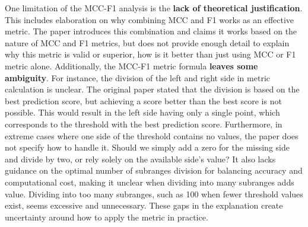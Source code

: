 \documentclass[12pt, oneside]{amsart}
\theoremstyle{definition}
\theoremstyle{remark}
\numberwithin{equation}{section}
\begin{document}
One limitation of the MCC-F1 analysis is the \textbf{lack of theoretical justification}. This includes elaboration on why combining MCC and F1 works as an effective metric. The paper introduces this combination and claims it works based on the nature of MCC and F1 metrics, but does not provide enough detail to explain why this metric is valid or superior, how is it better than just using MCC or F1 metric alone. Additionally, the MCC-F1 metric formula \textbf{leaves some ambiguity}. For instance, the division of the left and right side in metric calculation is unclear. The original paper stated that the division is based on the best prediction score, but achieving a score better than the best score is not possible. This would result in the left side having only a single point, which corresponds to the threshold with the best prediction score. Furthermore, in extreme cases where one side of the threshold contains no values, the paper does not specify how to handle it. Should we simply add a zero for the missing side and divide by two, or rely solely on the available side's value? It also lacks guidance on the optimal number of subranges division for balancing accuracy and computational cost, making it unclear when dividing into many subranges adds value. Dividing into too many subranges, such as 100 when fewer threshold values exist, seems excessive and unnecessary. These gaps in the explanation create uncertainty around how to apply the metric in practice.\\
\end{document}
